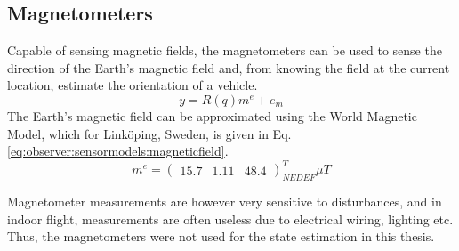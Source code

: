     \subsection{Magnetometers}
        Capable of sensing magnetic fields, the magnetometers can be used to
        sense the direction of the Earth's magnetic field and, from knowing
        the field at the current location, estimate the orientation of a vehicle.
        \begin{equation}
            y = R(q) m^{e} + e_{m}
        \end{equation}
        The Earth's magnetic field can be approximated using the World Magnetic Model\cite{wmm2010},
        which for Linköping, Sweden, is given in Eq. \eqref{eq:observer:sensormodels:magneticfield}.
        \begin{equation}
            \label{eq:observer:sensormodels:magneticfield}
            m^{e} = \left(\begin{array}{ccc}
                15.7 & 1.11 & 48.4
            \end{array}\right)_{NEDEF}^{T} \mu T
        \end{equation}

        Magnetometer measurements are however very sensitive to disturbances, and in indoor
        flight, measurements are often useless due to electrical wiring, lighting etc.
        Thus, the magnetometers were not used for the state estimation in this thesis.


